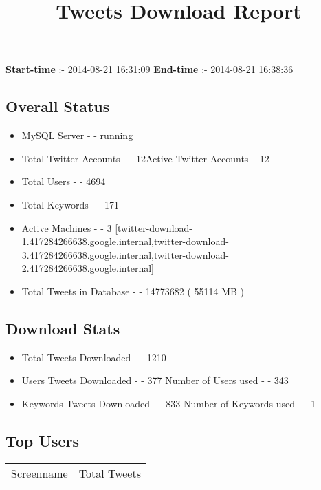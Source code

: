 \documentclass{article}\usepackage[T1]{fontenc}
\begin{document}
\title{\textbf{Tweets Download Report}}
               \date{}
                \maketitle
               \centerline{\textbf{Start-time} :- 2014-08-21 16:31:09 \hspace{40pt} \textbf{End-time} :- 2014-08-21 16:38:36}               \subsection*{Overall Status}                \begin{itemize}                \item MySQL Server - - running               \item Total Twitter Accounts - - 12\newline Active Twitter Accounts -- 12               \item Total Users - - 4694               \item Total Keywords - - 171               \item Active Machines - - 3 [twitter-download-1.417284266638.google.internal,twitter-download-3.417284266638.google.internal,twitter-download-2.417284266638.google.internal]               \item Total Tweets in Database - - 14773682 ( 55114 MB )               \end{itemize}               \subsection*{Download Stats}                \begin{itemize}                \item Total Tweets Downloaded - - 1210               \item Users Tweets Downloaded - - 377 \newline Number of Users used - - 343               \item Keywords Tweets Downloaded - - 833 \newline Number of Keywords used - - 1              \end{itemize}              \subsection*{Top Users}\begin{tabular}{|c|c|}         \hline         Screenname & Total Tweets \\ 

\end{tabular}
\end{document}

